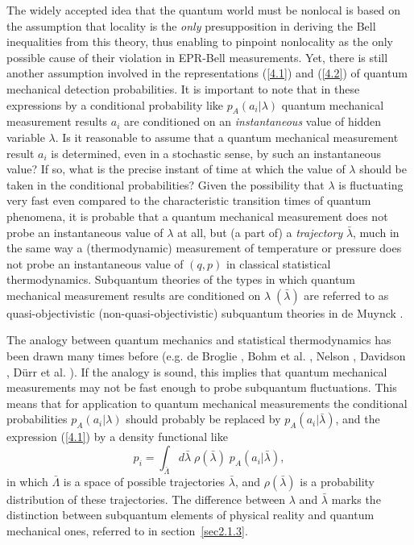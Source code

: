 \documentclass[12pt]{article}
\begin{document}
The widely accepted idea that the quantum world must be nonlocal
is based on the assumption that locality is the {\em only}
presupposition in deriving the Bell inequalities from this theory,
thus enabling to pinpoint nonlocality as the only possible cause
of their violation in EPR-Bell measurements. Yet, there is still
another assumption involved in the representations (\ref{4.1}) and
(\ref{4.2}) of quantum mechanical detection probabilities. It is
important to note that in these expressions by a conditional
probability like $p_A(a_i|\lambda)$ quantum mechanical measurement
results $a_i$ are conditioned on an {\em instantaneous} value of
hidden variable $\lambda$. Is it reasonable to assume that a
quantum mechanical measurement result $a_i$ is determined, even in
a stochastic sense, by such an instantaneous value? If so, what is
the precise instant of time at which the value of $\lambda$ should
be taken in the conditional probabilities? Given the possibility
that $\lambda$ is fluctuating very fast even compared to the
characteristic transition times of quantum phenomena, it is
probable that a quantum mechanical measurement does not probe an
instantaneous value of $\lambda$ at all, but (a part of) a {\em
trajectory} $\bar{\lambda}$, much in the same way a
(thermodynamic) measurement of temperature or pressure does not
probe an instantaneous value of $(q,p)$ in classical statistical
thermodynamics. Subquantum theories of the types in which quantum
mechanical measurement results are conditioned on $\lambda\;
(\bar{\lambda})$ are referred to as quasi-objectivistic
(non-quasi-objectivistic) subquantum theories in de Muynck
\cite{dM2002}.

The analogy between quantum mechanics and statistical
thermodynamics has been drawn many times before (e.g. de Broglie
\cite{deBroglie95}, Bohm et al. \cite{Bohm53,BoVi}, Nelson
\cite{Nelson67,Nelson85}, Davidson \cite{Dav79}, D\"urr et al.
\cite{DuGoZa92}). If the analogy is sound, this implies that
quantum mechanical measurements may not be fast enough to probe
subquantum fluctuations. This means that for application to
quantum mechanical measurements the conditional probabilities
$p_A(a_i|\lambda)$ should probably be replaced by
$p_A(a_i|\bar{\lambda})$, and the expression (\ref{4.1}) by a
density functional like
\begin{equation}
p_i=\int_{\bar{\Lambda}}
d\bar{\lambda}\;\rho(\bar{\lambda})\;p_A(a_i|\bar{\lambda}),\label{4.3}
\end{equation}
in which $\bar{\Lambda}$ is a space of possible trajectories
$\bar{\lambda}$, and $\rho(\bar{\lambda})$ is a probability
distribution of these trajectories. The difference between
$\lambda$ and $\bar{\lambda}$ marks the distinction between
subquantum elements of physical reality and quantum mechanical
ones, referred to in section~\ref{sec2.1.3}.
\end{document}
